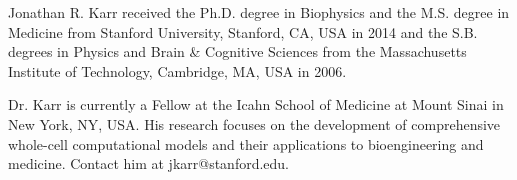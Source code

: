 \documentclass[journal,transmag]{IEEEtran}
\begin{document}
\begin{IEEEbiography}{Jonathan R. Karr}
received the Ph.D. degree in Biophysics and the M.S. degree in Medicine from Stanford University, Stanford, CA, USA in 2014 and the S.B. degrees in Physics and Brain \& Cognitive Sciences from the Massachusetts Institute of Technology, Cambridge, MA, USA in 2006. 

Dr. Karr is currently a Fellow at the Icahn School of Medicine at Mount Sinai in New York, NY, USA. His research focuses on the development of comprehensive whole-cell computational models and their applications to bioengineering and medicine. Contact him at jkarr@stanford.edu.
\end{IEEEbiography}




\end{document}
